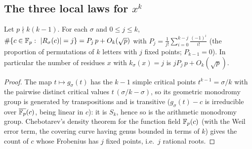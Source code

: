 \subsection*{The three local laws for $x^k$}

\begin{lemma}\label{lem:rootcounts}
Let $p\nmid k(k-1)$.  For each $\sigma$ and $0\le j\le k$,
$\#\{c\in\Fp:\ |R_\sigma(c)|=j\}=P_j\,p+O_k(\sqrt p)$ with $P_j=\frac1{j!}\sum_{i=0}^{k-j}\frac{(-1)^i}{i!}$ (the proportion of permutations of $k$ letters with
$j$ fixed points; $P_{k-1}=0$).  In particular the number of residues $x$ with $k_\sigma(x)=j$ is $jP_j\,p+O_k(\sqrt p)$.
\end{lemma}
\begin{proof}
The map $t\mapsto g_\sigma(t)$ has the $k-1$ simple critical points $t^{k-1}=\sigma/k$ with the pairwise distinct critical values $t\,(\sigma/k-\sigma)$,
so its geometric monodromy group is generated by transpositions and is transitive ($g_\sigma(t)-c$ is irreducible over $\overline{\mathbb{F}_p}(c)$, being linear in
$c$): it is $S_k$, hence so is the arithmetic monodromy group.  Chebotarev's density theorem for the function field $\mathbb{F}_p(c)$ (with the Weil error term, the
covering curve having genus bounded in terms of $k$) gives the count of $c$ whose Frobenius has $j$ fixed points, i.e.\ $j$ rational roots.
\end{proof}


